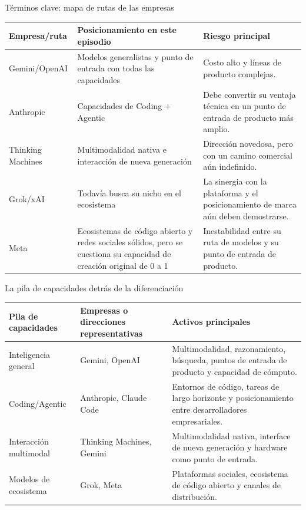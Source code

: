 \documentclass[a4paper]{article}
\begin{document}
\begin{knowledgebox}{Términos clave: mapa de rutas de las empresas}
\begin{tabularx}{\textwidth}{p{}p{}X}
\toprule
Empresa/ruta & Posicionamiento en este episodio & Riesgo principal \\
\midrule
Gemini/OpenAI & Modelos generalistas y punto de entrada con todas las capacidades & Costo alto y líneas de producto complejas. \\
Anthropic & Capacidades de Coding + Agentic & Debe convertir su ventaja técnica en un punto de entrada de producto más amplio. \\
Thinking Machines & Multimodalidad nativa e interacción de nueva generación & Dirección novedosa, pero con un camino comercial aún indefinido. \\
Grok/xAI & Todavía busca su nicho en el ecosistema & La sinergia con la plataforma y el posicionamiento de marca aún deben demostrarse. \\
Meta & Ecosistemas de código abierto y redes sociales sólidos, pero se cuestiona su capacidad de creación original de 0 a 1 & Inestabilidad entre su ruta de modelos y su punto de entrada de producto. \\
\bottomrule
\end{tabularx}
\end{knowledgebox}

\begin{knowledgebox}{La pila de capacidades detrás de la diferenciación}
\begin{tabularx}{\textwidth}{p{}p{}X}
\toprule
Pila de capacidades & Empresas o direcciones representativas & Activos principales \\
\midrule
Inteligencia general & Gemini, OpenAI & Multimodalidad, razonamiento, búsqueda, puntos de entrada de producto y capacidad de cómputo. \\
Coding/Agentic & Anthropic, Claude Code & Entornos de código, tareas de largo horizonte y posicionamiento entre desarrolladores empresariales. \\
Interacción multimodal & Thinking Machines, Gemini & Multimodalidad nativa, interface de nueva generación y hardware como punto de entrada. \\
Modelos de ecosistema & Grok, Meta & Plataformas sociales, ecosistema de código abierto y canales de distribución. \\
\bottomrule
\end{tabularx}
\end{knowledgebox}
\end{document}
